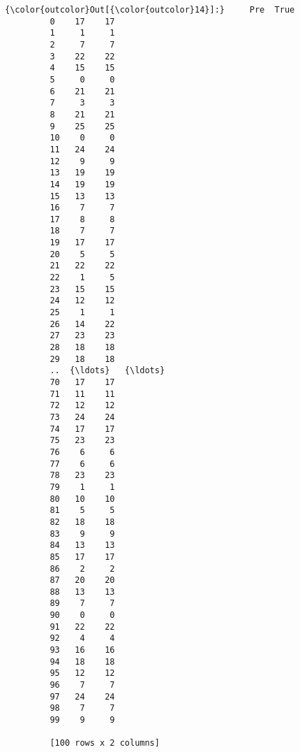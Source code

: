\documentclass[11pt]{article}
\begin{document}
\begin{Verbatim}[commandchars=\\\{\}]
{\color{outcolor}Out[{\color{outcolor}14}]:}     Pre  True
         0    17    17
         1     1     1
         2     7     7
         3    22    22
         4    15    15
         5     0     0
         6    21    21
         7     3     3
         8    21    21
         9    25    25
         10    0     0
         11   24    24
         12    9     9
         13   19    19
         14   19    19
         15   13    13
         16    7     7
         17    8     8
         18    7     7
         19   17    17
         20    5     5
         21   22    22
         22    1     5
         23   15    15
         24   12    12
         25    1     1
         26   14    22
         27   23    23
         28   18    18
         29   18    18
         ..  {\ldots}   {\ldots}
         70   17    17
         71   11    11
         72   12    12
         73   24    24
         74   17    17
         75   23    23
         76    6     6
         77    6     6
         78   23    23
         79    1     1
         80   10    10
         81    5     5
         82   18    18
         83    9     9
         84   13    13
         85   17    17
         86    2     2
         87   20    20
         88   13    13
         89    7     7
         90    0     0
         91   22    22
         92    4     4
         93   16    16
         94   18    18
         95   12    12
         96    7     7
         97   24    24
         98    7     7
         99    9     9
         
         [100 rows x 2 columns]
\end{Verbatim}
            

    
    
    
    
\end{document}
